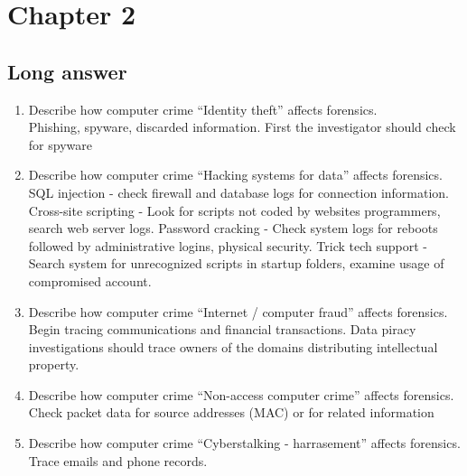 \section{Chapter 2}
\subsection{Long answer}
\begin{enumerate}
    \item Describe how computer crime \enquote{Identity theft} affects forensics.\\
    Phishing, spyware, discarded information.
    First the investigator should check for spyware 
    \item Describe how computer crime \enquote{Hacking systems for data} affects forensics.\\
    SQL injection - check firewall and database logs for connection information.
    Cross-site scripting - Look for scripts not coded by websites programmers, search web server logs.
    Password cracking - Check system logs for reboots followed by administrative logins, physical security.
    Trick tech support - Search system for unrecognized scripts in startup folders, examine usage of compromised account.
    \item Describe how computer crime \enquote{Internet / computer fraud} affects forensics.\\
    Begin tracing communications and financial transactions.
    Data piracy investigations should trace owners of the domains distributing intellectual property.
    \item Describe how computer crime \enquote{Non-access computer crime} affects forensics.\\
    Check packet data for source addresses (MAC) or for related information 
    \item Describe how computer crime \enquote{Cyberstalking - harrasement} affects forensics.\\
    Trace emails and phone records.
\end{enumerate}

